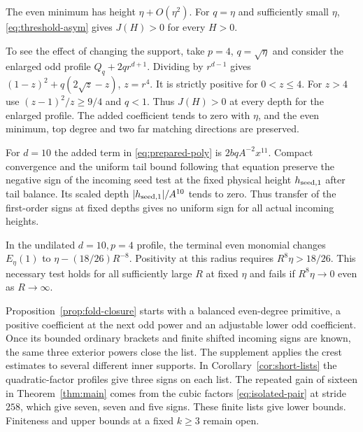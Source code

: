 \begin{remark}\label{rem:valley-insufficient}
The even minimum has height $\eta+O(\eta^2)$. For $q=\eta$ and sufficiently small
$\eta$, \eqref{eq:threshold-asym} gives $J(H)>0$ for every $H>0$.

To see the effect of changing the support, take $p=4$, $q=\sqrt\eta$
and consider the enlarged odd profile $Q_q+2q r^{d+1}$. Dividing by $r^{d-1}$
gives $(1-z)^2+q(2\sqrt z-z)$, $z=r^4$. It is strictly positive
for $0<z\le4$. For $z>4$ use $(z-1)^2/z\ge9/4$ and $q<1$.
Thus $J(H)>0$ at every depth for the enlarged profile. The added
coefficient tends to zero with $\eta$, and the even minimum, top degree
and two far matching directions are preserved.

For $d=10$ the added term in \eqref{eq:prepared-poly} is $2bqA^{-2}x^{11}$.
Compact convergence and the uniform tail bound following that equation
preserve the negative sign of the incoming seed test at the fixed
physical height $h_{\rm seed,1}$ after tail balance. Its scaled depth
$|h_{\rm seed,1}|/A^{10}$ tends to zero. Thus transfer of the
first-order signs at fixed depths gives no uniform sign for all actual
incoming heights.

In the undilated $d=10,p=4$ profile, the terminal even monomial changes
$E_\eta(1)$ to $\eta-(18/26)R^{-8}$. Positivity at this radius requires
$R^8\eta>18/26$. This necessary test holds for all sufficiently large
$R$ at fixed $\eta$ and fails if $R^8\eta\to0$ even as $R\to\infty$.
\end{remark}

\begin{remark}\label{rem:portability}
Proposition~\ref{prop:fold-closure} starts with a balanced even-degree
primitive, a positive coefficient at the next odd power and an adjustable
lower odd coefficient. Once its bounded ordinary brackets and finite
shifted incoming signs are known, the same three exterior powers
close the list. The supplement applies the crest estimates to several
different inner supports. In Corollary~\ref{cor:short-lists} the
quadratic-factor profiles give three signs on each list. The repeated
gain of sixteen in Theorem~\ref{thm:main} comes from the cubic factors
\eqref{eq:isolated-pair} at stride $258$, which give seven, seven and
five signs. These finite lists give lower bounds. Finiteness and upper
bounds at a fixed $k\ge3$ remain open.
\end{remark}
